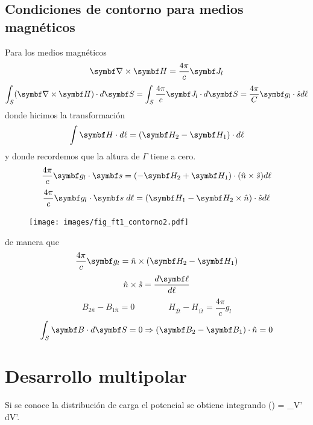 \documentclass[10pt,oneside]{CBFT_book}
\begin{document}



\subsection{Condiciones de contorno para medios magnéticos}

Para los medios magnéticos
\[
	\rotorm{H} = \frac{4 \pi}{c} \vb{J}_l
\]
\[
	\int_S (\rotorm{H}) \cdot d\vb{S} = \int_S \frac{4 \pi}{c} \vb{J}_l \cdot d\vb{S} = 
	\frac{4 \pi}{C} \vb{g}_l\cdot \hat{s} d\ell
\]
donde hicimos la transformación
\[
	\int \vb{H}\cdot d\ell = (\vb{H}_2-\vb{H}_1)\cdot d\ell
\]
y donde recordemos que la altura de $\Gamma$ tiene a cero.
\[
	\frac{4 \pi}{c} \vb{g}_l \cdot \vb{s} = ( -\vb{H}_2 + \vb{H}_1 )\cdot( \hat{n} \times \hat{s} ) d\ell
\]
\[
	\frac{4 \pi}{c} \vb{g}_l \cdot \vb{s} \; d\ell = (\vb{H}_1 -\vb{H}_2 \times \hat{n})\cdot \hat{s} 
d\ell
\]

\begin{figure}[htb]
	\begin{center}
	\texttt{[image: images/fig\_ft1\_contorno2.pdf]}	 
	\end{center}
	\caption{}
\end{figure} 

de manera que 
\[
	\frac{4 \pi}{c} \vb{g}_l = \hat{n} \times ( \vb{H}_2 - \vb{H}_1 )
\]
\[
	\hat{n}\times\hat{s} = \frac{d\vb{\ell}}{d\ell} 
\]
\[
	B_{2\hat{n}} - B_{1\hat{n}} = 0 \qquad \qquad H_{2\hat{t}} - H_{1\hat{t}} = \frac{4 \pi}{c} g_l
\]
\[
	\int_S \vb{B}\cdot d\vb{S} = 0 \Rightarrow (\vb{B}_2 - \vb{B}_1 )\cdot\hat{n} = 0
\]

\section{Desarrollo multipolar}

Si se conoce la distribución de carga el potencial se obtiene integrando
\be
	\phi() = \int_{V'}  \; dV'.
	\label{integral_potencial}
\ee
\end{document}
